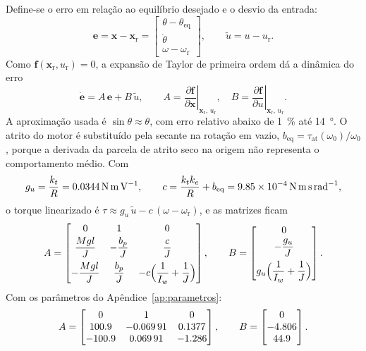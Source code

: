 \documentclass[11pt,a4paper]{article}
\newcommand{\vt}[1]{\bm{#1}}
\newcommand{\xref}{\vt{x}_{\mathrm{r}}}
\begin{document}
Define-se o erro em relação ao equilíbrio desejado e o desvio da entrada:
\begin{equation}
  \vt{e} = \vt{x} - \xref =
  \begin{bmatrix} \theta - \theta_{\mathrm{eq}} \\ \dot\theta \\ \omega - \omega_{\mathrm{r}} \end{bmatrix},
  \qquad
  \tilde u = u - u_{\mathrm{r}} .
\end{equation}
Como $\vt{f}(\xref, u_{\mathrm{r}}) = 0$, a expansão de Taylor de primeira ordem dá a
dinâmica do erro
\begin{equation}
  \dot{\vt{e}} = A\,\vt{e} + B\,\tilde u ,
  \qquad
  A = \left.\frac{\partial\vt{f}}{\partial\vt{x}}\right|_{\xref,\,u_{\mathrm{r}}},
  \quad
  B = \left.\frac{\partial\vt{f}}{\partial u}\right|_{\xref,\,u_{\mathrm{r}}} .
  \label{eq:erro}
\end{equation}
A aproximação usada é $\sin\theta \approx \theta$, com erro relativo abaixo de \qty{1}{\percent}
até \qty{14}{\degree}. O atrito do motor é substituído pela secante na rotação em vazio,
$b_{\text{eq}} = \tau_{\text{at}}(\omega_0)/\omega_0$, porque a derivada da parcela de atrito
seco na origem não representa o comportamento médio. Com
\begin{equation}
  g_u = \frac{k_t}{R} = \qty{0.0344}{\newton\metre\per\volt},
  \qquad
  c = \frac{k_t k_e}{R} + b_{\text{eq}} = \qty{9.85e-4}{\newton\metre\second\per\radian},
\end{equation}
o torque linearizado é $\tau \approx g_u\,\tilde u - c\,(\omega - \omega_{\mathrm{r}})$, e as matrizes ficam
\begin{equation}
  A =
  \begin{bmatrix}
    0 & 1 & 0 \\[2pt]
    \dfrac{Mgl}{J} & -\dfrac{b_p}{J} & \dfrac{c}{J} \\[8pt]
    -\dfrac{Mgl}{J} & \dfrac{b_p}{J} & -c\Bigl(\dfrac{1}{I_w} + \dfrac{1}{J}\Bigr)
  \end{bmatrix},
  \qquad
  B =
  \begin{bmatrix}
    0 \\[2pt] -\dfrac{g_u}{J} \\[8pt] g_u\Bigl(\dfrac{1}{I_w} + \dfrac{1}{J}\Bigr)
  \end{bmatrix} .
\end{equation}
Com os parâmetros do Apêndice~\ref{ap:parametros}:
\begin{equation}
  A = \begin{bmatrix} \num{0} & \num{1} & \num{0} \\ \num{100.9} & \num{-0.06991} & \num{0.1377} \\ \num{-100.9} & \num{0.06991} & \num{-1.286} \end{bmatrix} ,
  \qquad
  B = \begin{bmatrix} \num{0} \\ \num{-4.806} \\ \num{44.9} \end{bmatrix} .
\end{equation}
\end{document}
